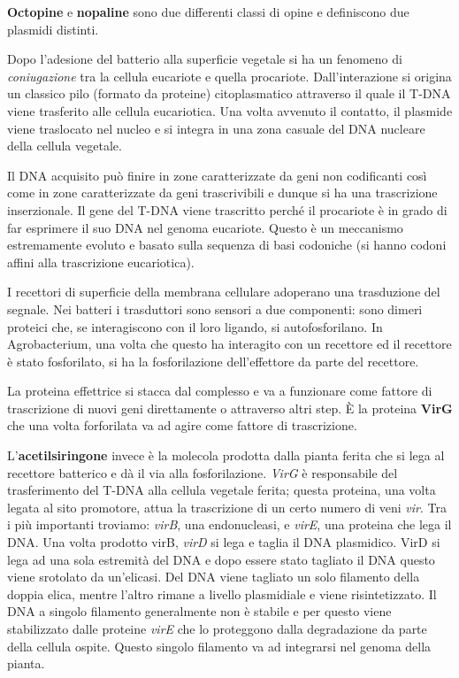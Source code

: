 \documentclass[]{article}
\begin{document}
\textbf{Octopine} e \textbf{nopaline} sono due differenti classi di
opine e definiscono due plasmidi distinti.

Dopo l'adesione del batterio alla superficie vegetale si ha un fenomeno
di \emph{coniugazione} tra la cellula eucariote e quella procariote.
Dall'interazione si origina un classico pilo (formato da proteine)
citoplasmatico attraverso il quale il T-DNA viene trasferito alle
cellula eucariotica. Una volta avvenuto il contatto, il plasmide viene
traslocato nel nucleo e si integra in una zona casuale del DNA nucleare
della cellula vegetale.

Il DNA acquisito può finire in zone caratterizzate da geni non
codificanti così come in zone caratterizzate da geni trascrivibili e
dunque si ha una trascrizione inserzionale. Il gene del T-DNA viene
trascritto perché il procariote è in grado di far esprimere il suo DNA
nel genoma eucariote. Questo è un meccanismo estremamente evoluto e
basato sulla sequenza di basi codoniche (si hanno codoni affini alla
trascrizione eucariotica).

I recettori di superficie della membrana cellulare adoperano una
trasduzione del segnale. Nei batteri i trasduttori sono sensori a due
componenti: sono dimeri proteici che, se interagiscono con il loro
ligando, si autofosforilano. In Agrobacterium, una volta che questo ha
interagito con un recettore ed il recettore è stato fosforilato, si ha
la fosforilazione dell'effettore da parte del recettore.

La proteina effettrice si stacca dal complesso e va a funzionare come
fattore di trascrizione di nuovi geni direttamente o attraverso altri
step. È la proteina \textbf{VirG} che una volta forforilata va ad agire
come fattore di trascrizione.

L'\textbf{acetilsiringone} invece è la molecola prodotta dalla pianta
ferita che si lega al recettore batterico e dà il via alla
fosforilazione. \emph{VirG} è responsabile del trasferimento del T-DNA
alla cellula vegetale ferita; questa proteina, una volta legata al sito
promotore, attua la trascrizione di un certo numero di veni \emph{vir}.
Tra i più importanti troviamo: \emph{virB}, una endonucleasi, e
\emph{virE}, una proteina che lega il DNA. Una volta prodotto virB,
\emph{virD} si lega e taglia il DNA plasmidico. VirD si lega ad una sola
estremità del DNA e dopo essere stato tagliato il DNA questo viene
srotolato da un'elicasi. Del DNA viene tagliato un solo filamento della
doppia elica, mentre l'altro rimane a livello plasmidiale e viene
risintetizzato. Il DNA a singolo filamento generalmente non è stabile e
per questo viene stabilizzato dalle proteine \emph{virE} che lo
proteggono dalla degradazione da parte della cellula ospite. Questo
singolo filamento va ad integrarsi nel genoma della pianta.
\end{document}
